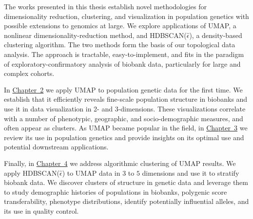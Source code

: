 The works presented in this thesis establish novel methodologies for dimensionality reduction, clustering, and visualization in population genetics with possible extensions to genomics at large. We explore applications of UMAP, a nonlinear dimensionality-reduction method, and HDBSCAN($\hat{\epsilon}$), a density-based clustering algorithm. The two methods form the basis of our topological data analysis. The approach is tractable, easy-to-implement, and fits in the paradigm of exploratory-confirmatory analysis of biobank data, particularly for large and complex cohorts.

In \hyperref[chap:chapter1]{Chapter~2} we apply UMAP to population genetic data for the first time. We establish that it efficiently reveals fine-scale population structure in biobanks and use it in data visualization in 2- and 3-dimensions. These visualizations correlate with a number of phenotypic, geographic, and socio-demographic measures, and often appear as clusters. As UMAP became popular in the field, in \hyperref[chap:chapter2]{Chapter~3} we review its use in population genetics and provide insights on its optimal use and potential downstream applications.

Finally, in \hyperref[chap:chapter3]{Chapter~4} we address algorithmic clustering of UMAP results. We apply HDBSCAN($\hat{\epsilon}$) to UMAP data in $3$ to $5$ dimensions and use it to stratify biobank data. We discover clusters of structure in genetic data and leverage them to study demographic histories of populations in biobanks, polygenic score transferability, phenotype distributions, identify potentially influential alleles, and its use in quality control.